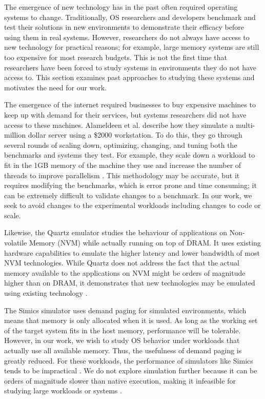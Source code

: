 \documentclass[twocolumn,11pt]{article}
\begin{document}
The emergence of new technology has in the past often required operating systems
to change. Traditionally, OS researchers and developers benchmark and test their
solutions in new environments to demonstrate their efficacy before using them in
real systems. However, researchers do not always have access to new technology
for practical reasons; for example, large memory systems are still too expensive
for most research budgets. This is not the first time that researchers have been
forced to study systems in environments they do not have access to. This section
examines past approaches to studying these systems and motivates the need for
our work.

The emergence of the internet required businesses to buy expensive machines to
keep up with demand for their services, but systems researchers did not have
access to these machines. Alameldeen et al. describe how they simulate a
multi-million dollar server using a \$2000 workstation. To do this, they go
through several rounds of scaling down, optimizing, changing, and tuning both
the benchmarks and systems they test. For example, they scale down a workload to
fit in the 1GB memory of the machine they use and increase the number of threads
to improve parallelism \cite{2kmachine}. This methodology may be accurate, but
it requires modifying the benchmarks, which is error prone and time consuming;
it can be extremely difficult to validate changes to a benchmark. In our work,
we seek to avoid changes to the experimental workloads including changes to code
or scale. 

Likewise, the Quartz emulator studies the behaviour of applications on
Non-volatile Memory (NVM) while actually running on top of DRAM. It uses
existing hardware capabilities to emulate the higher latency and lower bandwidth
of most NVM technologies. While Quartz does not address the fact that the actual
memory available to the applications on NVM might be orders of magnitude higher
than on DRAM, it demonstrates that new technologies may be emulated using
existing technology \cite{quartz}. 

The Simics simulator uses demand paging for simulated environments, which means
that memory is only allocated when it is used. As long as the working set of the
target system fits in the host memory, performance will be tolerable.  However,
in our work, we wish to study OS behavior under workloads that actually use all
available memory. Thus, the usefulness of demand paging is greatly reduced. For
these workloads, the performance of simulators like Simics tends to be
impractical \cite{simics}. We do not explore simulation further because it can
be orders of magnitude slower than native execution, making it infeasible for
studying large workloads or systems \cite{2kmachine}.
\end{document}
